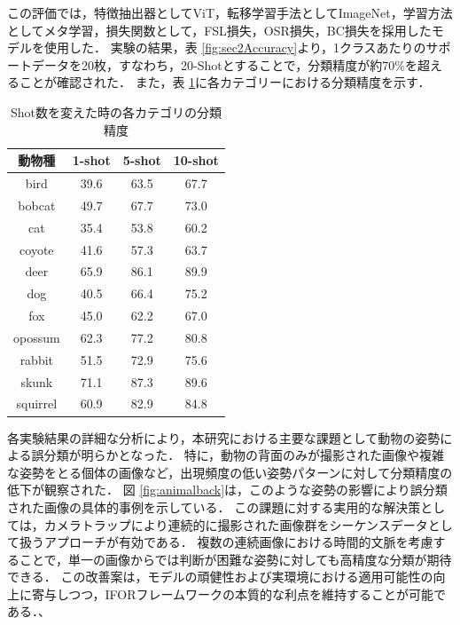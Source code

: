 \documentclass[a4paper,11pt,nomag]{jsreport}
\begin{document}
% 
この評価では，特徴抽出器としてViT，転移学習手法としてImageNet，学習方法としてメタ学習，損失関数として，FSL損失，OSR損失，BC損失を採用したモデルを使用した．
実験の結果，表 \ref{fig:sec2Accuracy}より，1クラスあたりのサポートデータを20枚，すなわち，20-Shotとすることで，分類精度が約70\%を超えることが確認された．
また，表 \ref{tbl:shot}に各カテゴリーにおける分類精度を示す．

\begin{table}[tbp]
  \centering
  \caption{Shot数を変えた時の各カテゴリの分類精度}
  \label{tbl:shot}
  \begin{tabular}{c|c|c|c}
      \hline
      動物種    & 1-shot & 5-shot & 10-shot \\ \hline\hline
      bird     & 39.6   & 63.5   & 67.7    \\
      bobcat   & 49.7   & 67.7   & 73.0    \\
      cat      & 35.4   & 53.8   & 60.2    \\
      coyote   & 41.6   & 57.3   & 63.7    \\
      deer     & 65.9   & 86.1   & 89.9    \\
      dog      & 40.5   & 66.4   & 75.2    \\
      fox      & 45.0   & 62.2   & 67.0    \\
      opossum  & 62.3   & 77.2   & 80.8    \\
      rabbit   & 51.5   & 72.9   & 75.6    \\
      skunk    & 71.1   & 87.3   & 89.6    \\
      squirrel & 60.9   & 82.9   & 84.8    \\ \hline
  \end{tabular}
\end{table}

各実験結果の詳細な分析により，本研究における主要な課題として動物の姿勢による誤分類が明らかとなった．
特に，動物の背面のみが撮影された画像や複雑な姿勢をとる個体の画像など，出現頻度の低い姿勢パターンに対して分類精度の低下が観察された．
図 \ref{fig:animalback}は，このような姿勢の影響により誤分類された画像の具体的事例を示している．
この課題に対する実用的な解決策としては，カメラトラップにより連続的に撮影された画像群をシーケンスデータとして扱うアプローチが有効である．
複数の連続画像における時間的文脈を考慮することで，単一の画像からでは判断が困難な姿勢に対しても高精度な分類が期待できる．
この改善案は，モデルの頑健性および実環境における適用可能性の向上に寄与しつつ，IFORフレームワークの本質的な利点を維持することが可能である．、
\end{document}
